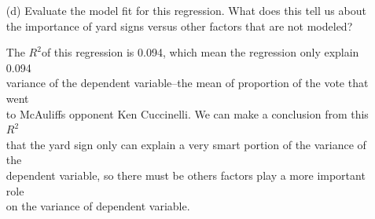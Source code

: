 \documentclass[12pt,letterpaper]{article}
\begin{document}
\begin{enumerate}
	\item [(d)] Evaluate the model fit for this regression.  What does this	tell us about the importance of yard signs versus other factors that are not modeled?
		\vspace{2 cm}
	    \begin{itemize}
		The $R^2$of this regression is 0.094, which mean the regression only explain 0.094\\
		variance of the dependent variable--the mean of proportion of the vote that went\\
		to McAuliffs opponent Ken Cuccinelli. We can make a conclusion from this $R^2$ \\
		that the yard sign only can explain a very smart portion of the variance of the \\
		dependent variable, so there must be others factors play a more important role \\
		on the variance of dependent variable.
	\end{itemize}
\end{enumerate}  
\end{document}
